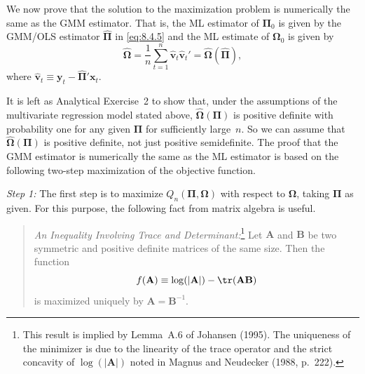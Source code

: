We now prove that the solution to the maximization problem is numerically the
same as the GMM estimator. That is, the ML estimator of $\boldsymbol{\Pi}_0$ is given by the
GMM/OLS estimator $\hat{\boldsymbol{\Pi}}$ in \eqref{eq:8.4.5} and the ML estimate of $\boldsymbol{\Omega}_0$ is given by
\begin{equation}
  \hat{\boldsymbol{\Omega}}
  = \frac{1}{n}\sum_{t=1}^{n}
    \hat{\mathbf{v}}_t \hat{\mathbf{v}}_t'
  = \hat{\boldsymbol{\Omega}}(\hat{\boldsymbol{\Pi}}),
  \label{eq:8.4.12} \tag{8.4.12}
\end{equation}
where $\hat{\mathbf{v}}_t \equiv \mathbf{y}_t - \hat{\boldsymbol{\Pi}}'\mathbf{x}_t$.

It is left as Analytical Exercise~2 to show that, under the assumptions of the
multivariate regression model stated above, $\hat{\boldsymbol{\Omega}}(\boldsymbol{\Pi})$ is positive definite with probability one for any given $\boldsymbol{\Pi}$ for sufficiently large~$n$. So we can assume that
$\hat{\boldsymbol{\Omega}}(\boldsymbol{\Pi})$ is positive definite, not just positive semidefinite.
The proof that the GMM estimator
is numerically the same as the ML estimator is based on the following two-step
maximization of the objective function.

\medskip
\noindent\textit{Step 1:}\quad
The first step is to maximize $Q_n(\boldsymbol{\Pi}, \boldsymbol{\Omega})$ with respect to $\boldsymbol{\Omega}$, taking $\boldsymbol{\Pi}$ as
given. For this purpose, the following fact from matrix algebra is useful.

\begin{quote}
\textit{An Inequality Involving Trace and Determinant:}\footnote{This result is implied by Lemma~A.6 of Johansen (1995). The uniqueness of the minimizer is due to the
linearity of the trace operator and the strict concavity of $\log(|\mathbf{A}|)$ noted in Magnus and Neudecker (1988, p.~222).}\quad
Let $\mathbf{A}$ and $\mathbf{B}$
be two symmetric and positive definite matrices of the same size.
Then the function
\[
  f(\mathbf{A}) \equiv \log(|\mathbf{A}|) - \tr(\mathbf{A}\mathbf{B})
\]
is maximized uniquely by $\mathbf{A} = \mathbf{B}^{-1}$.
\end{quote}

